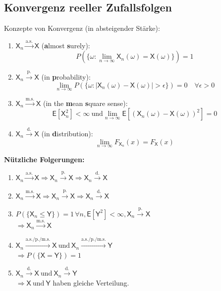 \documentclass[a4paper,twocolumn,10pt]{article}
\newenvironment{abc}{\begin{enumerate}[label={\alph*)}]}{\end{enumerate}}
\newenvironment{iii}{\begin{enumerate}[label={\roman{*})}]}{\end{enumerate}}
\newcommand{\erw}{\mathsf{E}}
\begin{document}
\subsection{Konvergenz reeller Zufallsfolgen}
Konzepte von Konvergenz (in absteigender Stärke):
\begin{iii}
  \item $\mathsf{X}_{n} \stackrel{\text{a.s.}}{\to} \mathsf{X}$ (\textbf{a}lmost \textbf{s}urely):
  \[ P(\{\omega : \lim_{n \to \infty} \mathsf{X}_{n}(\omega) = \mathsf{X}(\omega)\}) = 1\]
  \item $\mathsf{X}_{n} \stackrel{\text{p.}}{\to} \mathsf{X}$ (in \textbf{p}robability):
  \[ \lim_{n \to \infty} P(\{\omega : |\mathsf{X}_{n}(\omega) - \mathsf{X}(\omega)| > \epsilon\}) = 0 \quad \forall \epsilon > 0\]
  \item $\mathsf{X}_{n} \stackrel{\text{m.s.}}{\to} \mathsf{X}$ (in the \textbf{m}ean \textbf{s}quare sense):
  \[ \erw[\mathsf{X}_{n}^{2}] < \infty \ \text{und} \lim_{n \to \infty} \erw[\left(\mathsf{X}_{n}(\omega) - \mathsf{X}(\omega)\right)^{2}] = 0\]
  \item $\mathsf{X}_{n} \stackrel{\text{d.}}{\to} \mathsf{X}$ (in \textbf{d}istribution):
  \[ \lim_{n \to \infty} F_{\mathsf{X}_{n}}(x) = F_{\mathsf{X}}(x)\]
\end{iii}
\textbf{Nützliche Folgerungen:}
\begin{abc}
  \item $\mathsf{X}_{n} \stackrel{\text{a.s.}}{\to} \mathsf{X} \Rightarrow \mathsf{X}_{n} \stackrel{\text{p.}}{\to} \mathsf{X}\Rightarrow \mathsf{X}_{n} \stackrel{\text{d.}}{\to} \mathsf{X}$
  \item $\mathsf{X}_{n} \stackrel{\text{m.s.}}{\to} \mathsf{X} \Rightarrow \mathsf{X}_{n} \stackrel{\text{p.}}{\to} \mathsf{X}\Rightarrow \mathsf{X}_{n} \stackrel{\text{d.}}{\to} \mathsf{X}$
  \item $P(\{\mathsf{X}_{n} \leq \mathsf{Y}\}) = 1 \, \forall n, \erw[\mathsf{Y}^{2}] < \infty
 , \mathsf{X}_{n} \stackrel{\text{p.}}{\to} \mathsf{X}$\\
 $\Rightarrow \mathsf{X}_{n} \stackrel{\text{m.s.}}{\to} \mathsf{X}$
  \item $\mathsf{X}_{n} \stackrel{\text{a.s./p./m.s.}}{\to} \mathsf{X} \ \text{und} \ \mathsf{X}_{n} \stackrel{\text{a.s./p./m.s.}}{\to} \mathsf{Y}$\\
  $\Rightarrow P(\{ \mathsf{X} = \mathsf{Y}\}) = 1$
  \item $\mathsf{X}_{n} \stackrel{\text{d.}}{\to} \mathsf{X} \ \text{und} \ \mathsf{X}_{n} \stackrel{\text{d.}}{\to} \mathsf{Y}$\\
  $\Rightarrow \mathsf{X} \ \text{und} \ \mathsf{Y}$ haben gleiche Verteilung.
\end{abc}
\end{document}
